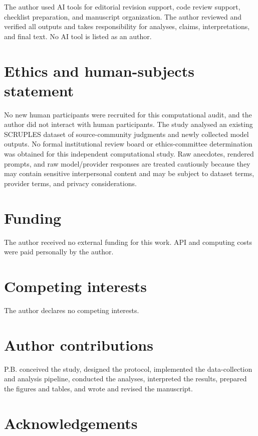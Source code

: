 \documentclass[11pt]{article}
\begin{document}
The author used AI tools for editorial revision support, code review support, checklist preparation, and manuscript organization. The author reviewed and verified all outputs and takes responsibility for analyses, claims, interpretations, and final text. No AI tool is listed as an author.

\section{Ethics and human-subjects statement}

No new human participants were recruited for this computational audit, and the author did not interact with human participants. The study analysed an existing SCRUPLES dataset of source-community judgments and newly collected model outputs. No formal institutional review board or ethics-committee determination was obtained for this independent computational study. Raw anecdotes, rendered prompts, and raw model/provider responses are treated cautiously because they may contain sensitive interpersonal content and may be subject to dataset terms, provider terms, and privacy considerations.

\section{Funding}

The author received no external funding for this work. API and computing costs were paid personally by the author.

\section{Competing interests}

The author declares no competing interests.

\section{Author contributions}

P.B. conceived the study, designed the protocol, implemented the data-collection and analysis pipeline, conducted the analyses, interpreted the results, prepared the figures and tables, and wrote and revised the manuscript.

\section{Acknowledgements}
\end{document}
